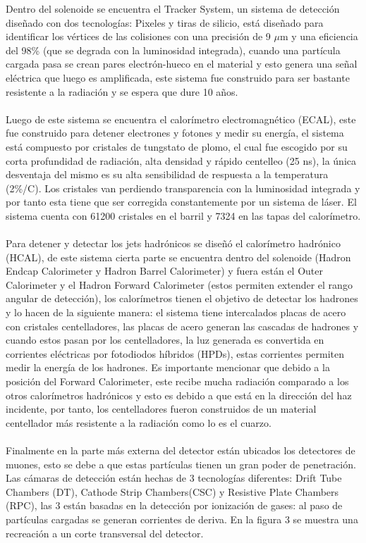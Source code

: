 Dentro del solenoide se encuentra el Tracker System, un sistema de detección diseñado con dos tecnologías: Pixeles y tiras de silicio, está diseñado para identificar los vértices de las colisiones con una precisión de 9 $\mu$m y una eficiencia del 98\% (que se degrada con la luminosidad integrada), cuando una partícula cargada pasa se crean pares electrón-hueco en el material y esto genera una señal eléctrica que luego es amplificada, este sistema fue construido para ser bastante resistente a la radiación y se espera que dure 10 años.
\\
\\
Luego de este sistema se encuentra el calorímetro electromagnético (ECAL), este fue construido para detener electrones y fotones y medir su energía, el sistema está compuesto por cristales de tungstato de plomo, el cual fue escogido por su corta profundidad de radiación, alta densidad y rápido centelleo (25 ns), la única desventaja del mismo es su alta sensibilidad de respuesta a la temperatura (2\%/C). Los cristales van perdiendo transparencia con la luminosidad integrada y por tanto esta tiene que ser corregida constantemente por un sistema de láser. El sistema cuenta con 61200 cristales en el barril y 7324 en las tapas del calorímetro.
\\
\\
Para detener y detectar los jets hadrónicos se diseñó el calorímetro hadrónico (HCAL), de este sistema cierta parte se encuentra dentro del solenoide (Hadron Endcap Calorimeter y Hadron Barrel Calorimeter) y fuera están el Outer Calorimeter y el Hadron Forward Calorimeter (estos permiten extender el rango angular de detección), los calorímetros tienen el objetivo de detectar los hadrones y lo hacen de la siguiente manera: el sistema tiene intercalados placas de acero con cristales centelladores, las placas de acero generan las cascadas de hadrones y cuando estos pasan por los centelladores, la luz generada es convertida en corrientes eléctricas por fotodiodos híbridos (HPDs), estas corrientes permiten medir la energía de los hadrones. Es importante mencionar que debido a la posición del Forward Calorimeter, este recibe mucha radiación comparado a los otros calorímetros hadrónicos y esto es debido a que está en la dirección del haz incidente, por tanto, los centelladores fueron construidos de un material centellador más resistente a la radiación como lo es el cuarzo.
\\
\\
Finalmente en la parte más externa del detector están ubicados los detectores de muones, esto se debe a que estas partículas tienen un gran poder de penetración. Las cámaras de detección están hechas de 3 tecnologías diferentes: Drift Tube Chambers (DT), Cathode Strip Chambers(CSC) y Resistive Plate Chambers (RPC), las 3 están basadas en la detección por ionización de gases: al paso de partículas cargadas se generan corrientes de deriva. En la figura 3 se muestra una recreación a un corte transversal del detector.

